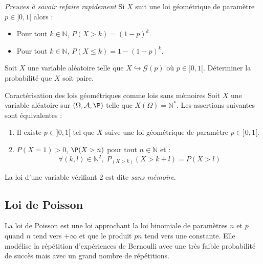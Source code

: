 \documentclass[french,11pt,twoside]{VcCours}
\begin{document}
\begin{Proposition}{\emph{Preuves à savoir refaire rapidement}}
Si $X$ suit une loi géométrique de paramètre $p \in ]0,1[$ alors :
\begin{itemize}
\item Pour tout $k \in \mathbb{N}$, $P(X>k)=(1-p)^k$.
\item Pour tout $k \in \mathbb{N}$, $P(X \leq k)=1-(1-p)^k$.
%
\end{itemize}
\end{Proposition}

\begin{Demonstration}{}
\vspace*{5cm}
\end{Demonstration}

\begin{ApplicationDirecte}{} Soit $X$ une variable aléatoire telle que $X \hookrightarrow \mathcal{G}(p)$ où $p \in ]0,1[$. Déterminer la probabilité que $X$ soit paire.
\end{ApplicationDirecte}

\begin{Proposition}{Caractérisation des lois géométriques comme lois sans mémoires}
Soit $X$ une variable aléatoire sur $(\Omega, \mathcal{A}, \P)$ telle que $X(\Omega) = \mathbb{N}^*$. Les assertions suivantes sont équivalentes :
\begin{enumerate}
\item Il existe $p \in ]0,1[$ tel que $X$ suive une loi géométrique de paramètre $p \in ]0,1[$.
\item $P(X=1)>0$, $\P(X>n)$ pour tout $n \in \mathbb{N}$ et :
$$ \forall (k,l) \in \mathbb{N}^2, \; P_{(X>k)}(X>k+l)=P(X>l)$$
\end{enumerate}
La loi d'une variable vérifiant $2$ est dite \emph{sans mémoire}.
\end{Proposition}

\begin{Demonstration}{}

\newpage

\vspace*{3cm}
\end{Demonstration}

\subsection{Loi de Poisson}
La loi de Poisson est une loi \og approchant \fg la loi binomiale de paramètres $n$ et $p$ quand $n$ tend vers $+ \infty$ et que le produit $pn$ tend vers une constante. Elle modélise la répétition d'expériences de Bernoulli avec une très faible probabilité de succès mais avec un grand nombre de répétitions.
\end{document}
